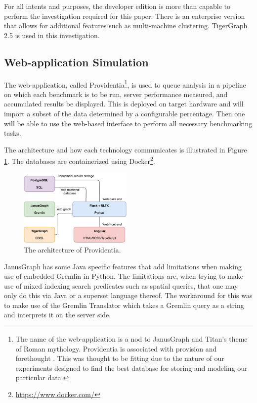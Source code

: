 For all intents and purposes, the developer edition is more than capable to perform the investigation required for this paper. There is an enterprise version that allows for additional features such as multi-machine clustering. TigerGraph 2.5 is used in this investigation.

\subsection{Web-application Simulation}

The web-application, called Providentia\footnote{The name of the web-application is a nod to JanusGraph and Titan's theme of Roman mythology. Providentia is associated with provision and forethought \cite{providentia-meaning}. This was thought to be fitting due to the nature of our experiments designed to find the best database for storing and modeling our particular data.}, is used to queue analysis in a pipeline on which each benchmark is to be run, server performance measured, and accumulated results be displayed. This is deployed on target hardware and will import a subset of the data determined by a configurable percentage. Then one will be able to use the web-based interface to perform all necessary benchmarking tasks.

The architecture and how each technology communicates is illustrated in Figure \ref{fig:providentia-architecture}. The databases are containerized using Docker\footnote{\url{https://www.docker.com/}}.

\begin{figure}[h]
    \centering
    \includegraphics[width=0.49\textwidth]{img/providentia-architecture.pdf}
    \caption{The architecture of Providentia.}
    \label{fig:providentia-architecture}
\end{figure}

JanusGraph has some Java specific features that add limitations when making use of embedded Gremlin in Python. The limitations are, when trying to make use of mixed indexing search predicates such as spatial queries, that one may only do this via Java or a superset language thereof. The workaround for this was to make use of the Gremlin Translator which takes a Gremlin query as a string and interprets it on the server side.

